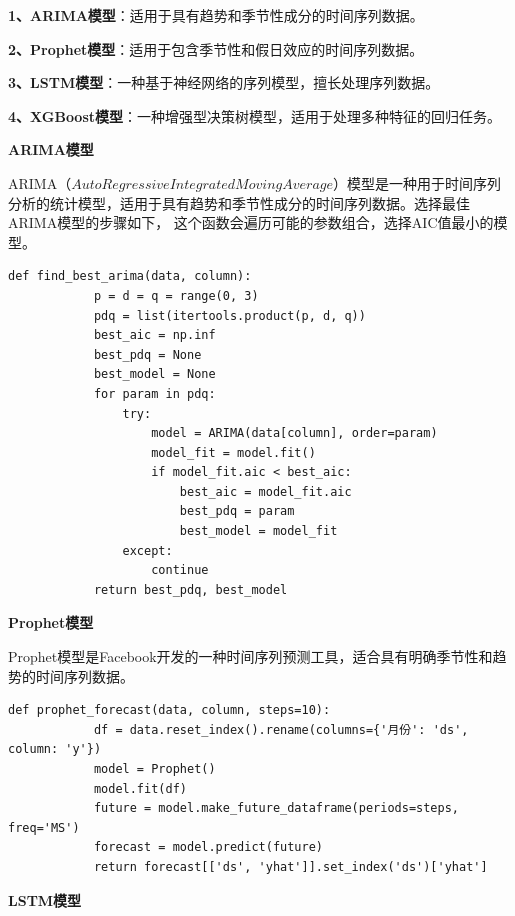 \documentclass[a4paper]{article}
\begin{document}
	\textbf{1、ARIMA模型}：适用于具有趋势和季节性成分的时间序列数据。

	\textbf{2、Prophet模型}：适用于包含季节性和假日效应的时间序列数据。

	\textbf{3、LSTM模型}：一种基于神经网络的序列模型，擅长处理序列数据。

	\textbf{4、XGBoost模型}：一种增强型决策树模型，适用于处理多种特征的回归任务。

	\textbf{ARIMA模型}

	ARIMA（$AutoRegressive Integrated Moving Average$）模型是一种用于时间序列分析的统计模型，适用于具有趋势和季节性成分的时间序列数据。选择最佳ARIMA模型的步骤如下，
	这个函数会遍历可能的参数组合，选择AIC值最小的模型。
	\begin{lstlisting}[caption={Python Example}, label={lst:example}]
		def find_best_arima(data, column):
			p = d = q = range(0, 3)
			pdq = list(itertools.product(p, d, q))
			best_aic = np.inf
			best_pdq = None
			best_model = None
			for param in pdq:
				try:
					model = ARIMA(data[column], order=param)
					model_fit = model.fit()
					if model_fit.aic < best_aic:
						best_aic = model_fit.aic
						best_pdq = param
						best_model = model_fit
				except:
					continue
			return best_pdq, best_model
	\end{lstlisting}
	
	\textbf{Prophet模型}
	
	Prophet模型是Facebook开发的一种时间序列预测工具，适合具有明确季节性和趋势的时间序列数据。
	\begin{lstlisting}[caption={Python Example}, label={lst:example}]
		def prophet_forecast(data, column, steps=10):
			df = data.reset_index().rename(columns={'月份': 'ds', column: 'y'})
			model = Prophet()
			model.fit(df)
			future = model.make_future_dataframe(periods=steps, freq='MS')
			forecast = model.predict(future)
			return forecast[['ds', 'yhat']].set_index('ds')['yhat']

	\end{lstlisting}

	\textbf{LSTM模型}
\end{document}
